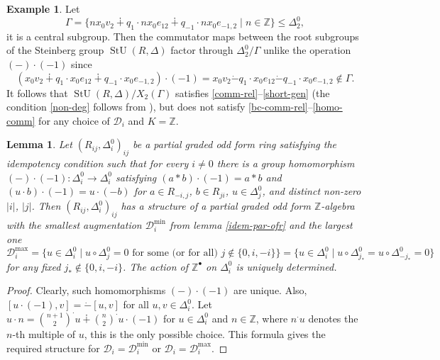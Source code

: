 \documentclass{article}
\newtheorem{lemma}{Lemma}
\theoremstyle{definition}
\newtheorem{example}{Example}
\newcommand{\dotminus}{\mathbin{\dot{-}}}
\DeclareMathOperator\stunit{StU}
\begin{document}
\begin{example}
    Let \[
        \Gamma = \{
            nx_0 v_2
            \dotplus q_1 \cdot nx_0 e_{12}
            \dotplus q_{-1} \cdot nx_0 e_{-1, 2}
            \mid
            n \in \mathbb Z
        \} \leq \Delta^0_2,
    \] it is a central subgroup. Then the commutator maps between the root subgroups of the Steinberg group \(\stunit(R, \Delta)\) factor through \(
        \Delta^0_2 / \Gamma
    \) unlike the operation \((-) \cdot (-1)\) since \[
        (
            x_0 v_2
            \dotplus q_1 \cdot x_0 e_{12}
            \dotplus q_{-1} \cdot x_0 e_{-1, 2}
        ) \cdot (-1)
        =
        x_0 v_2
        \dotminus q_1 \cdot x_0 e_{12}
        \dotminus q_{-1} \cdot x_0 e_{-1, 2}
        \notin \Gamma.
    \] It follows that \(
        \stunit(R, \Delta) / X_2(\Gamma)
    \) satisfies \ref{comm-rel}--\ref{short-gen} (the condition \ref{non-deg} follows from \cite[lemma 11]{thesis}), but does not satisfy \ref{bc-comm-rel}--\ref{homo-comm} for any choice of \(\mathcal D_i\) and \(K = \mathbb Z\).
\end{example}

\begin{lemma} \label{idem-cond}
    Let \(
        (R_{ij}, \Delta^0_i)_{ij}
    \) be a partial graded odd form ring satisfying the idempotency condition such that for every \(i \neq 0\) there is a group homomorphism \(
        ({-}) \cdot (-1)
        \colon \Delta^0_i \to \Delta^0_i
    \) satisfying \(
        (a * b) \cdot (-1) = a * b
    \) and \(
        (u \cdot b) \cdot (-1) = u \cdot (-b)
    \) for \(a \in R_{-i, j}\), \(b \in R_{ji}\), \(u \in \Delta^0_j\), and distinct non-zero \(|i|\), \(|j|\). Then \(
        (R_{ij}, \Delta^0_i)_{ij}
    \) has a structure of a partial graded odd form \(\mathbb Z\)-algebra with the smallest augmentation \(
        \mathcal D^{\mathrm{min}}_i
    \) from lemma \ref{idem-par-ofr} and the largest one \[
        \mathcal D^{\mathrm{max}}_i = \{
            u \in \Delta^0_i
            \mid
            u \circ \Delta^0_j = 0
            \text{ for some (or for all) } j \notin \{0, i, -i\}
        \} = \{
            u \in \Delta^0_i
            \mid
            u \circ \Delta^0_{j_*}
            =
            u \circ \Delta^0_{-j_*}
            = 0
        \}
    \] for any fixed \(
        j_* \notin \{0, i, -i\}
    \). The action of \(\mathbb Z^\bullet\) on \(\Delta^0_i\) is uniquely determined.
\end{lemma}
\begin{proof}
    Clearly, such homomorphisms \(({-}) \cdot (-1)\) are unique. Also, \(
        [u \cdot (-1), v] = \dotminus [u, v]
    \) for all \(u, v \in \Delta^0_i\). Let \(
        u \cdot n
        =
        {\binom{n + 1}2}^\cdot u
        \dotplus {\binom n 2}^\cdot u \cdot (-1)
    \) for \(u \in \Delta^0_i\) and \(n \in \mathbb Z\), where \(n^\cdot u\) denotes the \(n\)-th multiple of \(u\), this is the only possible choice. This formula gives the required structure for \(
        \mathcal D_i = \mathcal D_i^{\mathrm{min}}
    \) or \(
        \mathcal D_i = \mathcal D_i^{\mathrm{max}}
    \).
\end{proof}
\end{document}
